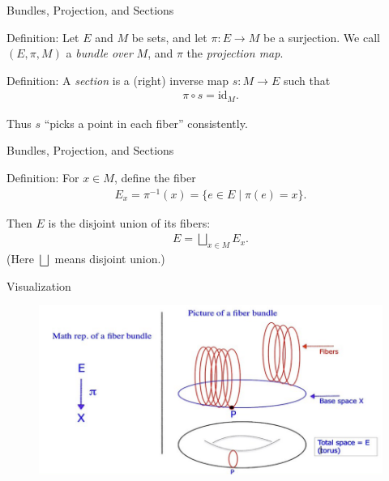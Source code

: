 \documentclass[11pt,aspectratio=43,ignorenonframetext,t]{beamer}
\begin{document}
\begin{frame}{Bundles, Projection, and Sections}

\begin{block}{Definition:} Let \(E\) and \(M\) be sets, and let \(\pi: E \to M\) be a surjection.  
We call \((E, \pi, M)\) a \emph{bundle over} \(M\), and \(\pi\) the \emph{projection map}.
\end{block}

\begin{block}{Definition:} 
A \emph{section} is a (right) inverse map \(s: M \to E\) such that  
\begin{align*}
\pi \circ s = \mathrm{id}_M.
\end{align*}

Thus \(s\) “picks a point in each fiber” consistently.
\end{block}
\end{frame}

\begin{frame}{Bundles, Projection, and Sections}

\begin{block}{Definition:} For \(x \in M\), define the fiber
\begin{align*}
E_x = \pi^{-1}(x) = \{ e \in E \mid \pi(e) = x \}.
\end{align*}

Then \(E\) is the disjoint union of its fibers:
\begin{align*}
E = \bigsqcup_{x \in M} E_x.
\end{align*}
(Here \(\bigsqcup\) means disjoint union.)
\end{block}

\end{frame}


\begin{frame}{Visualization}
\begin{figure}
    \centering
    \includegraphics[width=0.85\linewidth]{Image5.png}
\end{figure}
    
\end{frame}
\end{document}

